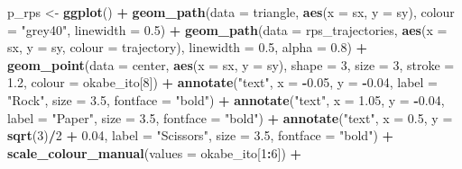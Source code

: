 \documentclass[
]{article}
\newenvironment{Shaded}{\begin{snugshade}}{\end{snugshade}}
\newcommand{\AttributeTok}[1]{\textcolor[rgb]{0.13,0.29,0.53}{#1}}
\newcommand{\DecValTok}[1]{\textcolor[rgb]{0.00,0.00,0.81}{#1}}
\newcommand{\FloatTok}[1]{\textcolor[rgb]{0.00,0.00,0.81}{#1}}
\newcommand{\FunctionTok}[1]{\textcolor[rgb]{0.13,0.29,0.53}{\textbf{#1}}}
\newcommand{\NormalTok}[1]{#1}
\newcommand{\OtherTok}[1]{\textcolor[rgb]{0.56,0.35,0.01}{#1}}
\newcommand{\SpecialCharTok}[1]{\textcolor[rgb]{0.81,0.36,0.00}{\textbf{#1}}}
\newcommand{\StringTok}[1]{\textcolor[rgb]{0.31,0.60,0.02}{#1}}
\begin{document}
\begin{Shaded}
\begin{Highlighting}[]
\NormalTok{p\_rps }\OtherTok{\textless{}{-}} \FunctionTok{ggplot}\NormalTok{() }\SpecialCharTok{+}
  \FunctionTok{geom\_path}\NormalTok{(}\AttributeTok{data =}\NormalTok{ triangle, }\FunctionTok{aes}\NormalTok{(}\AttributeTok{x =}\NormalTok{ sx, }\AttributeTok{y =}\NormalTok{ sy),}
            \AttributeTok{colour =} \StringTok{"grey40"}\NormalTok{, }\AttributeTok{linewidth =} \FloatTok{0.5}\NormalTok{) }\SpecialCharTok{+}
  \FunctionTok{geom\_path}\NormalTok{(}\AttributeTok{data =}\NormalTok{ rps\_trajectories,}
            \FunctionTok{aes}\NormalTok{(}\AttributeTok{x =}\NormalTok{ sx, }\AttributeTok{y =}\NormalTok{ sy, }\AttributeTok{colour =}\NormalTok{ trajectory),}
            \AttributeTok{linewidth =} \FloatTok{0.5}\NormalTok{, }\AttributeTok{alpha =} \FloatTok{0.8}\NormalTok{) }\SpecialCharTok{+}
  \FunctionTok{geom\_point}\NormalTok{(}\AttributeTok{data =}\NormalTok{ center, }\FunctionTok{aes}\NormalTok{(}\AttributeTok{x =}\NormalTok{ sx, }\AttributeTok{y =}\NormalTok{ sy),}
             \AttributeTok{shape =} \DecValTok{3}\NormalTok{, }\AttributeTok{size =} \DecValTok{3}\NormalTok{, }\AttributeTok{stroke =} \FloatTok{1.2}\NormalTok{, }\AttributeTok{colour =}\NormalTok{ okabe\_ito[}\DecValTok{8}\NormalTok{]) }\SpecialCharTok{+}
  \FunctionTok{annotate}\NormalTok{(}\StringTok{"text"}\NormalTok{, }\AttributeTok{x =} \SpecialCharTok{{-}}\FloatTok{0.05}\NormalTok{, }\AttributeTok{y =} \SpecialCharTok{{-}}\FloatTok{0.04}\NormalTok{, }\AttributeTok{label =} \StringTok{"Rock"}\NormalTok{,}
           \AttributeTok{size =} \FloatTok{3.5}\NormalTok{, }\AttributeTok{fontface =} \StringTok{"bold"}\NormalTok{) }\SpecialCharTok{+}
  \FunctionTok{annotate}\NormalTok{(}\StringTok{"text"}\NormalTok{, }\AttributeTok{x =} \FloatTok{1.05}\NormalTok{, }\AttributeTok{y =} \SpecialCharTok{{-}}\FloatTok{0.04}\NormalTok{, }\AttributeTok{label =} \StringTok{"Paper"}\NormalTok{,}
           \AttributeTok{size =} \FloatTok{3.5}\NormalTok{, }\AttributeTok{fontface =} \StringTok{"bold"}\NormalTok{) }\SpecialCharTok{+}
  \FunctionTok{annotate}\NormalTok{(}\StringTok{"text"}\NormalTok{, }\AttributeTok{x =} \FloatTok{0.5}\NormalTok{, }\AttributeTok{y =} \FunctionTok{sqrt}\NormalTok{(}\DecValTok{3}\NormalTok{)}\SpecialCharTok{/}\DecValTok{2} \SpecialCharTok{+} \FloatTok{0.04}\NormalTok{, }\AttributeTok{label =} \StringTok{"Scissors"}\NormalTok{,}
           \AttributeTok{size =} \FloatTok{3.5}\NormalTok{, }\AttributeTok{fontface =} \StringTok{"bold"}\NormalTok{) }\SpecialCharTok{+}
  \FunctionTok{scale\_colour\_manual}\NormalTok{(}\AttributeTok{values =}\NormalTok{ okabe\_ito[}\DecValTok{1}\SpecialCharTok{:}\DecValTok{6}\NormalTok{]) }\SpecialCharTok{+}

\end{Highlighting}
\end{Shaded}
\end{document}
